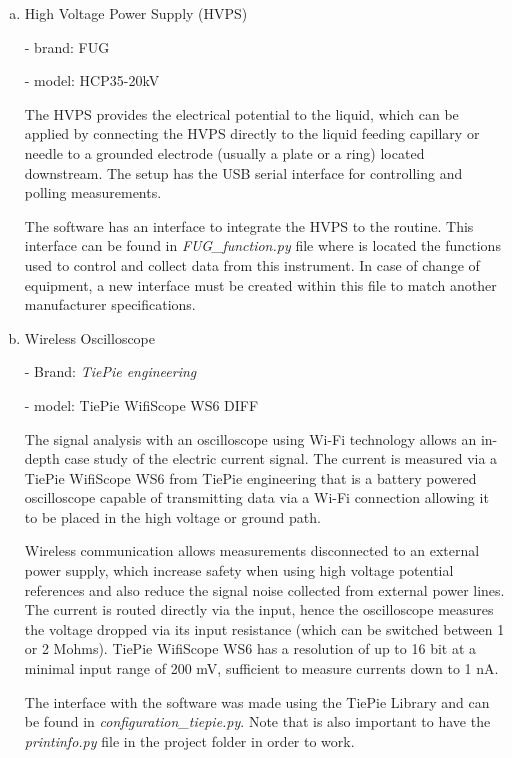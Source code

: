 \begin{enumerate}[a)]

  \item High Voltage Power Supply (HVPS)
  
     - brand: FUG
    
     - model: HCP35-20kV
    
    The HVPS provides the electrical potential to the liquid, which can be applied by connecting the HVPS directly to the liquid feeding capillary or needle to a grounded electrode (usually a plate or a ring) located downstream.\cite{Monica}
    The setup has the USB serial interface for controlling and polling measurements.
    
    The software has an interface to integrate the HVPS to the routine. This interface can be found in \emph{FUG\_function.py} file where is located the functions used to control and collect data from this instrument.
    In case of change of equipment, a new interface must be created within this file to match another manufacturer specifications.

  \item Wireless Oscilloscope
  
     - Brand: \emph{TiePie engineering}

     - model: TiePie WifiScope WS6 DIFF
    
    The signal analysis with an oscilloscope using Wi-Fi technology allows an in-depth case study of the electric current signal.
    The current is measured via a TiePie WifiScope WS6 from TiePie engineering that is a battery powered oscilloscope capable of transmitting data via a Wi-Fi connection allowing it to be placed in the high voltage or ground path.
    
    Wireless communication allows measurements disconnected to an external power supply, which increase safety when using high voltage potential references and also reduce the signal noise collected from external power lines.
    The current is routed directly via the input, hence the oscilloscope measures the voltage dropped via its input resistance (which can be switched between 1 or 2 Mohms).
    TiePie WifiScope WS6 has a resolution of up to 16 bit at a minimal input range of 200 mV, sufficient to measure currents down to 1 nA.

    The interface with the software was made using the TiePie Library\cite{TiePieLib} and can be found in \emph{configuration\_tiepie.py}. Note that is also important to have the \emph{printinfo.py} file in the project folder in order to work.


\end{enumerate}
